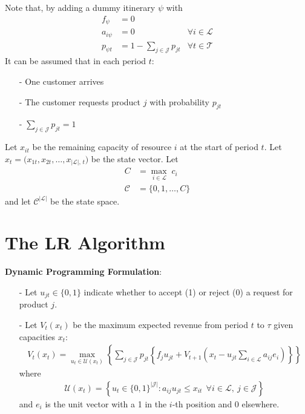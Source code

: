 \documentclass[11pt]{article}
\begin{document}
\noindent
Note that, by adding a dummy itinerary $\psi$ with 
\begin{align*}
    f_{\psi} &= 0 \\
    a_{i\psi} &= 0 & \forall i \in \mathcal{L} \\
    p_{\psi t} &= 1 - \sum_{j\in \mathcal{J}} p_{jt} & \forall t \in \mathcal{T}
\end{align*}
It can be assumed that in each period $t$:
\begin{itemize}[itemsep=0pt,parsep=0pt]
\item[-] One customer arrives
\item[-] The customer requests product $j$ with probability $p_{jt}$
\item[-] $\sum_{j\in \mathcal{J}} p_{jt} = 1$
\end{itemize}

\noindent
Let $x_{it}$ be the remaining capacity of resource $i$ at the start of period $t$. 
Let $x_t = \bigl(x_{1t}, x_{2t}, \dots, x_{|\mathcal L|,\,t}\bigr)$ be the state vector. 
Let
\begin{align*}
    C &= \max_{\,i\in\mathcal L}\;c_i \\
    \mathcal{C} &= \{0, 1, \ldots, C\} 
\end{align*}
and let $\mathcal{C}^{|\mathcal{L}|}$ be the state space.

\vspace{0.5cm}




\section{The LR Algorithm}

\noindent
\textbf{Dynamic Programming Formulation}:
\begin{itemize}[itemsep=0pt,parsep=0pt]
\item[-] Let $u_{jt}\in\{0,1\}$ indicate whether to accept (1) or reject (0) a request for product $j$.
\item[-] Let $V_t(x_t)$ be the maximum expected revenue from period $t$ to $\tau$ given capacities $x_t$:
    \begin{align*}
        V_t(x_t) = \max_{u_t \in \mathcal{U}(x_t)} 
            \left\{ \sum_{j\in \mathcal{J}} p_{jt} 
            \left\{ 
                f_j u_{jt} + 
                V_{t+1} \left(x_t - u_{jt}\sum_{i\in \mathcal{L}}a_{ij}e_i\right) 
            \right\} \right\} 
        \tag{DP1}
    \end{align*}
    where
    \begin{align*}
        \mathcal{U}(x_t) = \left\{ 
            u_{t} \in \{0,1\}^{|\mathcal{J}|} : 
            a_{ij} u_{jt} \le x_{it} \ \ 
            \forall i \in \mathcal{L}, \ j \in \mathcal{J}
        \right\} 
    \end{align*}
    and $e_i$ is the unit vector with a 1 in the $i$-th position and 0 elsewhere.
\end{itemize}
\end{document}
